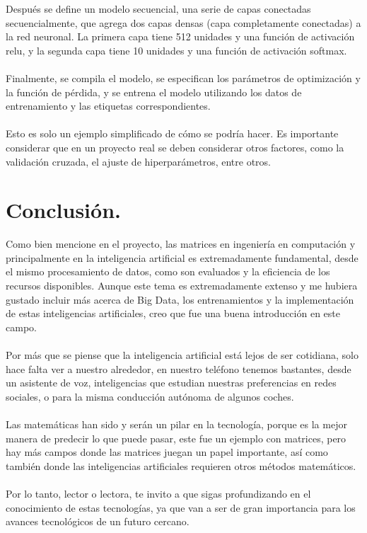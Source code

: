 \documentclass{article}
\theoremstyle{mytheoremstyle}
\theoremstyle{mytheoremstyle}
\theoremstyle{myproblemstyle}
\begin{document}
Después se define un modelo secuencial, una serie de capas conectadas secuencialmente, que agrega dos capas densas (capa completamente conectadas) a la red neuronal. La primera capa tiene 512 unidades y una función de activación relu, y la segunda capa tiene 10 unidades y una función de activación softmax.
\\
\\
Finalmente, se compila el modelo, se especifican los parámetros de optimización y la función de pérdida, y se entrena el modelo utilizando los datos de entrenamiento y las etiquetas correspondientes.
\\
\\
Esto es solo un ejemplo simplificado de cómo se podría hacer. Es importante considerar que en un proyecto real se deben considerar otros factores, como la validación cruzada, el ajuste de hiperparámetros, entre otros.
\\
\section{Conclusión.}

Como bien mencione en el proyecto, las matrices en ingeniería en computación y principalmente en la inteligencia artificial es extremadamente fundamental, desde el mismo procesamiento de datos, como son evaluados y la eficiencia de los recursos disponibles. Aunque este tema es extremadamente extenso y me hubiera gustado incluir más acerca de Big Data, los entrenamientos y la implementación de estas inteligencias artificiales, creo que fue una buena introducción en este campo. 
\\
\\
Por más que se piense que la inteligencia artificial está lejos de ser cotidiana, solo hace falta ver a nuestro alrededor, en nuestro teléfono tenemos bastantes, desde un asistente de voz, inteligencias que estudian nuestras preferencias en redes sociales, o para la misma conducción autónoma de algunos coches.
\\
\\
Las matemáticas han sido y serán un pilar en la tecnología, porque es la mejor manera de predecir lo que puede pasar, este fue un ejemplo con matrices, pero hay más campos donde las matrices juegan un papel importante, así como también donde las inteligencias artificiales requieren otros métodos matemáticos.
\\
\\
Por lo tanto, lector o lectora, te invito a que sigas profundizando en el conocimiento de estas tecnologías, ya que van a ser de gran importancia para los avances tecnológicos de un futuro cercano.
\end{document}
